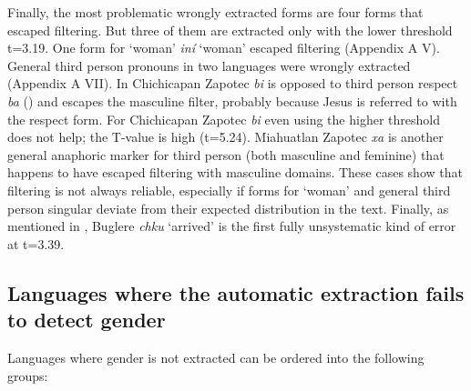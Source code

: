 \documentclass[output=collectionpaper]{langsci/langscibook}
\begin{document}
Finally, the most problematic wrongly extracted forms are four forms that escaped filtering. But three of them are extracted only with the lower threshold t=3.19. One form for ‘woman’  \textit{iní} ‘woman’ escaped filtering (Appendix A V). General third person pronouns in two  languages were wrongly extracted (Appendix A VII). In Chichicapan Zapotec \textit{bi} is opposed to third person respect \textit{ba} (\citealt{Benton1975}) and escapes the masculine filter, probably because Jesus is referred to with the respect form. For Chichicapan Zapotec \textit{bi} even using the higher threshold does not help; the T-value is high (t=5.24). Miahuatlan Zapotec \textit{xa\textquotesingle} is another general anaphoric marker for third person (both masculine and feminine) that happens to have escaped filtering with masculine domains. These cases show that filtering is not always reliable, especially if forms for ‘woman’ and general third person singular deviate from their expected distribution in the text. Finally, as mentioned in , Buglere \textit{chku} ‘arrived’ is the first fully unsystematic kind of error at t=3.39.

\subsection{Languages where the automatic extraction fails to detect gender}
\label{sec:BW:3.5}

Languages where gender is not extracted can be ordered into the following groups:
\end{document}
